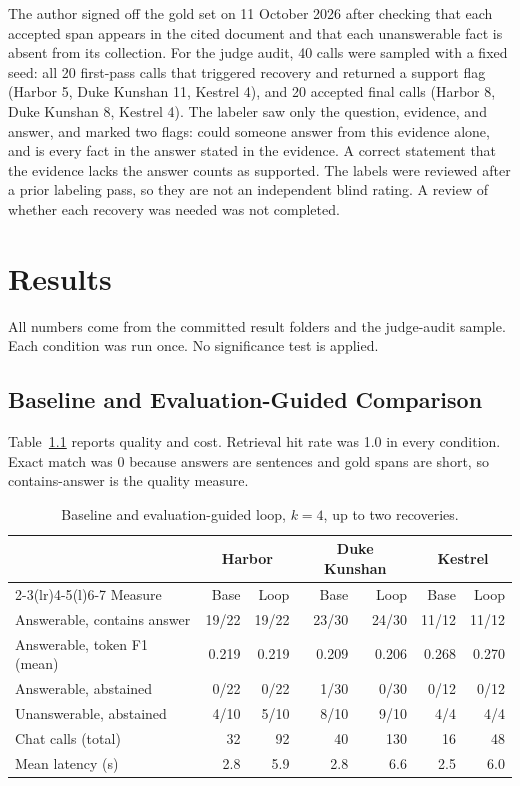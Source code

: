 \documentclass[12pt, a4paper, oneside]{report}
\begin{document}
The author signed off the gold set on 11 October 2026 after checking
that each accepted span appears in the cited document and that each
unanswerable fact is absent from its collection. For the judge audit, 40
calls were sampled with a fixed seed: all 20 first-pass calls that
triggered recovery and returned a support flag (Harbor 5, Duke Kunshan
11, Kestrel 4), and 20 accepted final calls (Harbor 8, Duke Kunshan 8,
Kestrel 4). The labeler saw only the question, evidence, and answer, and
marked two flags: could someone answer from this evidence alone, and is
every fact in the answer stated in the evidence. A correct statement
that the evidence lacks the answer counts as supported. The labels were
reviewed after a prior labeling pass, so they are not an independent
blind rating. A review of whether each recovery was needed was not
completed.


\chapter{Results}
\label{results}

All numbers come from the committed result folders and the judge-audit
sample. Each condition was run once. No significance test is applied.

\section{Baseline and Evaluation-Guided Comparison}

Table~\ref{tbl:main} reports quality and cost. Retrieval hit rate was 1.0
in every condition. Exact match was 0 because answers are sentences and
gold spans are short, so contains-answer is the quality measure.

\begin{table}[htbp]
\centering
\footnotesize
\setlength{\tabcolsep}{4pt}
\begin{tabular}{@{}lrrrrrr@{}}
\toprule
 & \multicolumn{2}{c}{Harbor} & \multicolumn{2}{c}{Duke Kunshan} & \multicolumn{2}{c}{Kestrel} \\
\cmidrule(lr){2-3}\cmidrule(lr){4-5}\cmidrule(l){6-7}
Measure & Base & Loop & Base & Loop & Base & Loop \\
\midrule
Answerable, contains answer & 19/22 & 19/22 & 23/30 & 24/30 & 11/12 & 11/12 \\
Answerable, token F1 (mean) & 0.219 & 0.219 & 0.209 & 0.206 & 0.268 & 0.270 \\
Answerable, abstained & 0/22 & 0/22 & 1/30 & 0/30 & 0/12 & 0/12 \\
Unanswerable, abstained & 4/10 & 5/10 & 8/10 & 9/10 & 4/4 & 4/4 \\
Chat calls (total) & 32 & 92 & 40 & 130 & 16 & 48 \\
Mean latency (s) & 2.8 & 5.9 & 2.8 & 6.6 & 2.5 & 6.0 \\
\bottomrule
\end{tabular}
\caption{Baseline and evaluation-guided loop, $k=4$, up to two recoveries.}
\label{tbl:main}
\end{table}
\end{document}
